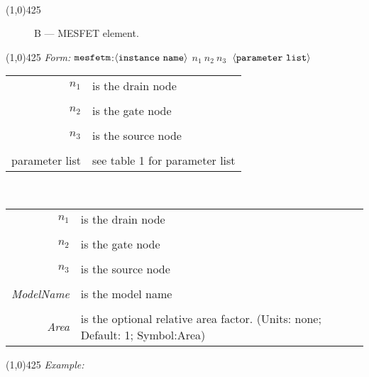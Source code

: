 \documentclass{article}
\begin{document}
\\
\hrulefill\linethickness{0.5mm}\line(1,0){425}
\normalsize
\newline
\begin{figure}[h]
\centerline{\epsfxsize=1.5in} \caption{B --- MESFET
element.}
\end{figure}
\newline
\linethickness{0.5mm}\line(1,0){425}
\newline
\textit{\FDA Form:}
$\tt mesfetm $:$\langle \tt{instance\ name}\rangle$ $n_1\ n_2\
n_3\ $ $\langle \tt{parameter\ list}\rangle$
\newline
\begin{tabular}{r l}
$n_1$ & is the drain node \\
&  \\
$n_2$ & is the gate node \\
&  \\
$n_3$ & is the source node \\
& \\
parameter list & see table 1 for parameter list
\end{tabular}\\
\newline
\newline
\begin{tabular}{r l}
$n_1$ & is the drain node \\
& \\
$n_2$ & is the gate node \\
&  \\
$n_3$ & is the source node \\
& \\
\textit{ModelName} & is the model name \\
&  \\
\textit{Area} & is the optional relative area factor. (Units: none; Default: 1; Symbol:Area)\\
\end{tabular}
\newline
\linethickness{0.5mm}\line(1,0){425}
\newline
\textit{Example:}\\
\end{document}
